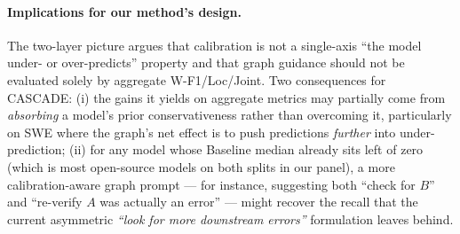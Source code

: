 \paragraph{Implications for our method's design.}
The two-layer picture argues that calibration is not a single-axis
``the model under- or over-predicts'' property and that graph
guidance should not be evaluated solely by aggregate
W-F1/Loc/Joint. Two consequences for CASCADE: (i) the gains it
yields on aggregate metrics may partially come from \emph{absorbing}
a model's prior conservativeness rather than overcoming it,
particularly on SWE where the graph's net effect is to push
predictions \emph{further} into under-prediction; (ii) for any
model whose Baseline median already sits left of zero (which is
most open-source models on both splits in our panel), a more
calibration-aware graph prompt — for instance, suggesting both
``check for $B$'' and ``re-verify $A$ was actually an error'' —
might recover the recall that the current asymmetric
\emph{``look for more downstream errors''} formulation leaves
behind.

